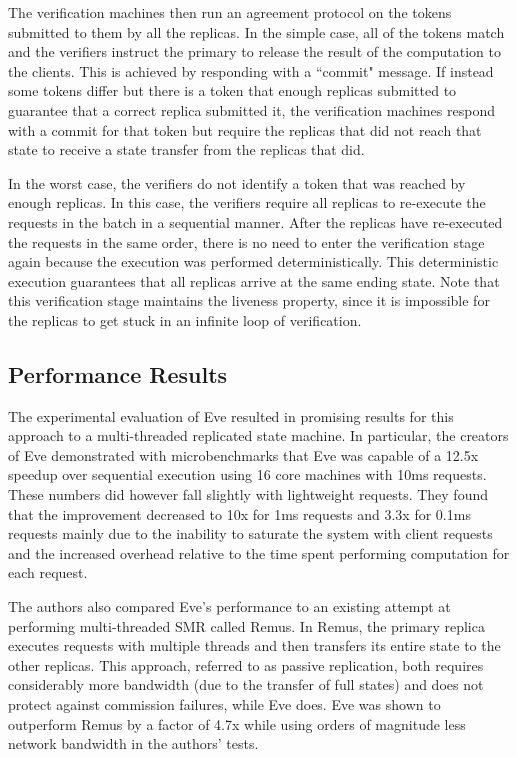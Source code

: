 \documentclass[11pt, oneside]{report}
\begin{document}
The verification machines then run an agreement protocol on the tokens submitted to them by all the replicas. 
In the simple case, all of the tokens match and the verifiers instruct the primary to release the result of the computation to the clients. 
This is achieved by responding with a ``commit" message. 
If instead some tokens differ but there is a token that enough replicas submitted to guarantee that a correct replica submitted it, the verification machines respond with a commit for that token but require the replicas that did not reach that state to receive a state transfer from the replicas that did. 


In the worst case, the verifiers do not identify a token that was reached by enough replicas. 
In this case, the verifiers require all replicas to re-execute the requests in the batch in a sequential manner. 
After the replicas have re-executed the requests in the same order, there is no need to enter the verification stage again because the execution was performed deterministically. 
This deterministic execution guarantees that all replicas arrive at the same ending state. 
Note that this verification stage maintains the liveness property, since it is impossible for the replicas to get stuck in an infinite loop of verification.

\subsection{Performance Results}\label{EveResults}

The experimental evaluation of Eve resulted in promising results for this approach to a multi-threaded replicated state machine. 
In particular, the creators of Eve demonstrated with microbenchmarks that Eve was capable of a 12.5x speedup over sequential execution using 16 core machines with 10ms requests. 
These numbers did however fall slightly with lightweight requests. 
They found that the improvement decreased to 10x for 1ms requests and 3.3x for 0.1ms requests mainly due to the inability to saturate the system with client requests and the increased overhead relative to the time spent performing computation for each request.

The authors also compared Eve's performance to an existing attempt at performing multi-threaded SMR called Remus. 
In Remus, the primary replica executes requests with multiple threads and then transfers its entire state to the other replicas. 
This approach, referred to as passive replication, both requires considerably more bandwidth (due to the transfer of full states) and does not protect against commission failures, while Eve does. 
Eve was shown to outperform Remus by a factor of 4.7x while using orders of magnitude less network bandwidth in the authors' tests.
\end{document}
